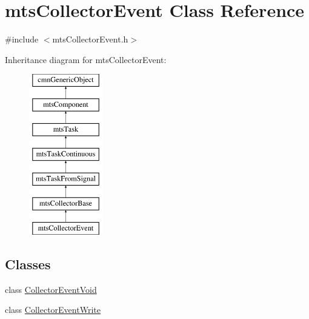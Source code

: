 \hypertarget{classmts_collector_event}{}\section{mts\+Collector\+Event Class Reference}
\label{classmts_collector_event}


{\ttfamily \#include $<$mts\+Collector\+Event.\+h$>$}

Inheritance diagram for mts\+Collector\+Event\+:\begin{figure}[H]
\begin{center}
\leavevmode
\includegraphics[height=7.000000cm]{d5/dba/classmts_collector_event}
\end{center}
\end{figure}
\subsection*{Classes}
\begin{DoxyCompactItemize}
\item 
class \hyperlink{classmts_collector_event_1_1_collector_event_void}{Collector\+Event\+Void}
\item 
class \hyperlink{classmts_collector_event_1_1_collector_event_write}{Collector\+Event\+Write}
\end{DoxyCompactItemize}
